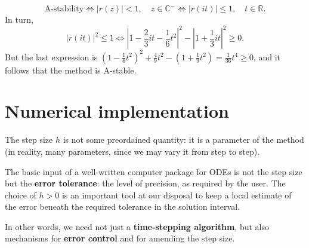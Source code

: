 \documentclass[a4paper]{article}
\begin{document}
\begin{example}
\[
\text {A-stability} \iff |r(z)|<1, \quad z \in \mathbb{C}^{-}  \iff  |r(i t)| \leq 1, \quad t \in \mathbb{R} .
\]
In turn,
\[
|r(i t)|^2 \leq 1  \iff  \left|1-\frac{2}{3} i t-\frac{1}{6} t^2\right|^2-\left|1+\frac{1}{3} i t\right|^2 \geq 0 .
\]
But the last expression is $\left(1-\frac{1}{6} t^2\right)^2+\frac{4}{9} t^2-\left(1+\frac{1}{9} t^2\right)=\frac{1}{36} t^4 \geq 0$, and it follows that the method is A-stable.
\end{example}

\section{Numerical implementation}
\begin{problem}
    The step size $h$ is not some preordained quantity: it is a parameter of the method (in reality, many parameters, since we may vary it from step to step). 
    
    The basic input of a well-written computer package for ODEs is not the step size but the \textbf{error tolerance}: the level of precision, as required by the user. The choice of $h>0$ is an important tool at our disposal to keep a local estimate of the error beneath the required tolerance in the solution interval. 
    
    In other words, we need not just a \textbf{time-stepping algorithm}, but also mechanisms for \textbf{error control} and for amending the step size.
\end{problem}
\end{document}

